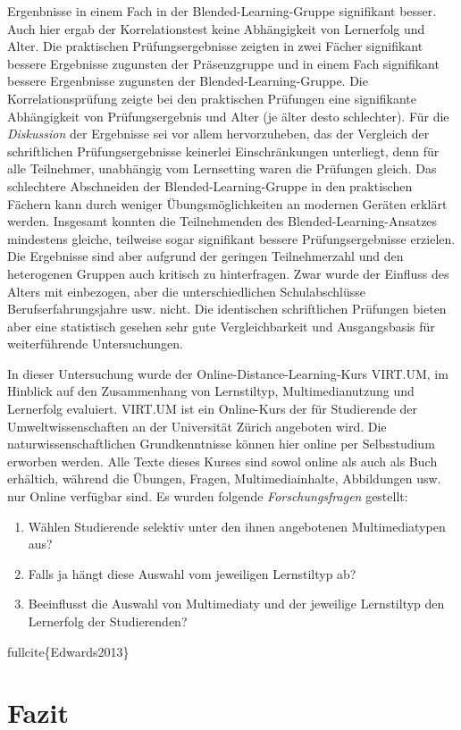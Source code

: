 Ergenbnisse in einem Fach in der Blended-Learning-Gruppe signifikant
besser. Auch hier ergab der Korrelationstest keine Abhängigkeit von
Lernerfolg und Alter. Die praktischen Prüfungsergebnisse zeigten in zwei
Fächer signifikant bessere Ergebnisse zugunsten der Präsenzgruppe und in
einem Fach signifikant bessere Ergenbnisse zugunsten der
Blended-Learning-Gruppe. Die Korrelationsprüfung zeigte bei den
praktischen Prüfungen eine signifikante Abhängigkeit von
Prüfungsergebnis und Alter (je älter desto schlechter). Für die
\emph{Diskussion} der Ergebnisse sei vor allem hervorzuheben, das der
Vergleich der schriftlichen Prüfungsergebnisse keinerlei Einschränkungen
unterliegt, denn für alle Teilnehmer, unabhängig vom Lernsetting waren
die Prüfungen gleich. Das schlechtere Abschneiden der
Blended-Learning-Gruppe in den praktischen Fächern kann durch weniger
Übungsmöglichkeiten an modernen Geräten erklärt werden. Insgesamt
konnten die Teilnehmenden des Blended-Learning-Ansatzes mindestens
gleiche, teilweise sogar signifikant bessere Prüfungsergebnisse
erzielen. Die Ergebnisse sind aber aufgrund der geringen Teilnehmerzahl
und den heterogenen Gruppen auch kritisch zu hinterfragen. Zwar wurde
der Einfluss des Alters mit einbezogen, aber die unterschiedlichen
Schulabschlüsse Berufserfahrungsjahre usw. nicht. Die identischen
schriftlichen Prüfungen bieten aber eine statistisch gesehen sehr gute
Vergleichbarkeit und Ausgangsbasis für weiterführende Untersuchungen.

\textbf{}

In dieser Untersuchung wurde der Online-Distance-Learning-Kurs VIRT.UM,
im Hinblick auf den Zusammenhang von Lernstiltyp, Multimedianutzung und
Lernerfolg evaluiert. VIRT.UM ist ein Online-Kurs der für Studierende
der Umweltwissenschaften an der Universität Zürich angeboten wird. Die
naturwissenschaftlichen Grundkenntnisse können hier online per
Selbsstudium erworben werden. Alle Texte dieses Kurses sind sowol online
als auch als Buch erhältich, während die Übungen, Fragen,
Multimediainhalte, Abbildungen usw. nur Online verfügbar sind. Es wurden
folgende \emph{Forschungsfragen} gestellt:

\begin{enumerate}
\def\labelenumi{\arabic{enumi}.}
\itemsep1pt\parskip0pt
\item
  Wählen Studierende selektiv unter den ihnen angebotenen
  Multimediatypen aus?
\item
  Falls ja hängt diese Auswahl vom jeweiligen Lernstiltyp ab?
\item
  Beeinflusst die Auswahl von Multimediaty und der jeweilige Lernstiltyp
  den Lernerfolg der Studierenden?
\end{enumerate}



fullcite\{Edwards2013\}

\section{Fazit}\label{fazit}
